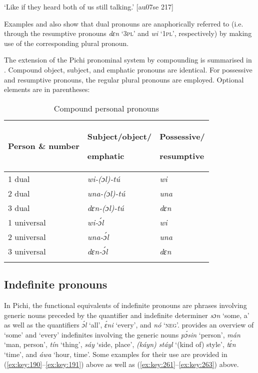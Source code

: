 \glt ‘Like if they heard both of us still talking.’ [au07se 217]
\z

Examples  and  also show that dual pronouns are anaphorically referred to (i.e. through the resumptive pronouns \textit{dɛn} ‘\textsc{3pl}’ and \textit{wi} ‘\textsc{1pl}’, respectively) by making use of the corresponding plural pronoun. 


The extension of the Pichi pronominal system by compounding is summarised in . Compound object, subject, and emphatic pronouns are identical. For possessive and resumptive pronouns, the regular plural pronouns are employed. Optional elements are in parentheses:


\begin{table}
\caption{Compound personal pronouns}
\label{tab:key:5.7}


\begin{tabularx}{\textwidth}{XXX}
\lsptoprule

Person \& number & Subject/object/

emphatic & Possessive/

resumptive\\
\midrule
1 dual & \itshape wi-(ɔl)-tú & \itshape wi\\
2 dual & \itshape una-(ɔl)-tú & \itshape una\\
3 dual & \itshape dɛn-(ɔl)-tú & \itshape dɛn\\
1 universal & \itshape wi-ɔ́l & \itshape wi\\
2 universal & \itshape una-ɔ́l & \itshape una\\
3 universal & \itshape dɛn-ɔ́l & \itshape dɛn\index{}\\
\lspbottomrule
\end{tabularx}
\end{table}
\subsection{Indefinite pronouns} \label{sec:5.4.3}

In Pichi, the functional equivalents of indefinite pronouns are phrases involving generic nouns preceded by the quantifier{\fff} and indefinite determiner \textit{sɔn} ‘some, a’ as well as the quantifier{\fff}s \textit{ɔ́l} ‘all’, \textit{ɛ́ni} ‘every’, and \textit{nó} ‘\textsc{neg}’.  provides an overview of ‘some’ and ‘every’ indefinites involving the generic nouns \textit{pɔ́sin} ‘person’, \textit{mán} ‘man, person’, \textit{tín} ‘thing’, \textit{sáy} ‘side, place’, \textit{(káyn) stáyl} ‘(kind of) style’, \textit{tɛ́n} ‘time’, and \textit{áwa} ‘hour, time’. Some examples for their use are provided in (\ref{ex:key:190}–\ref{ex:key:191}) above as well as (\ref{ex:key:261}–\ref{ex:key:263}) above. 


